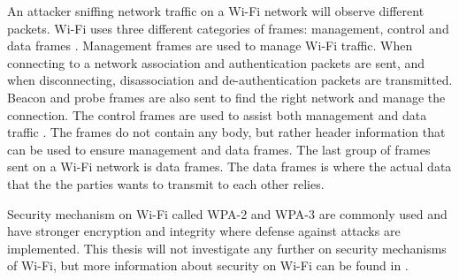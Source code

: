 An attacker sniffing network traffic on a \gls{Wi-Fi} network will observe different packets. \gls{Wi-Fi} uses three different categories of frames: management, control and data frames \cite{WiFiFrameMGMT}. Management frames are used to manage \gls{Wi-Fi} traffic. When connecting to a network association and authentication packets are sent, and when disconnecting, disassociation and de-authentication packets are transmitted. Beacon and probe frames are also sent to find the right network and manage the connection. The control frames are used to assist both management and data traffic \cite{WiFiFrames}. The frames do not contain any body, but rather header information that can be used to ensure management and data frames. The last group of frames sent on a \gls{Wi-Fi} network is data frames. The data frames is where the actual data that the the parties wants to transmit to each other relies. 

Security mechanism on \gls{Wi-Fi} called \gls{WPA}-2 and \gls{WPA}-3 are commonly used and have stronger encryption and integrity where defense against attacks are implemented. This thesis will not investigate any further on security mechanisms of \gls{Wi-Fi}, but more information about security on \gls{Wi-Fi} can be found in \cite{WAP}. 